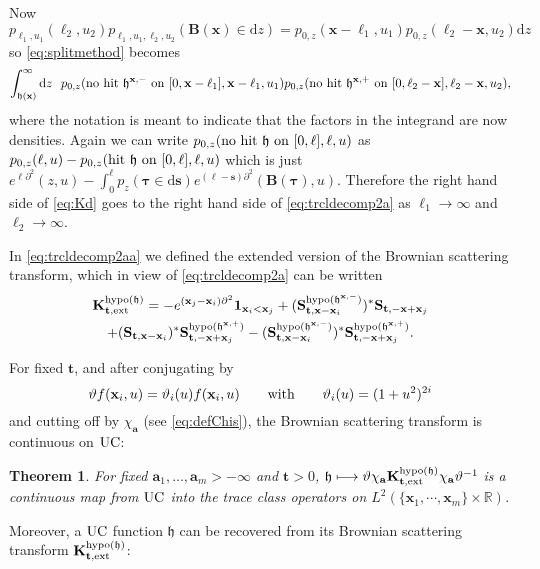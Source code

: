 \documentclass[letterpaper,reqno,11pt,oneside,final]{amsart}
\newtheorem{theorem}[thm]{Theorem}
\theoremstyle{definition}
\newcommand{\fh}{\mathfrak{h}}
\newcommand{\rr}{\mathbb{R}}
\newcommand{\p}{\partial}
\newcommand{\uno}[1]{\mathbf{1}_{#1}}
\newcommand{\uptext}[1]{\text{\upshape{#1}}}
\DeclareMathOperator{\hypo}{\uptext{hypo}}
\DeclareMathOperator{\UC}{\uptext{UC}}
\renewcommand{\d}{\mathrm{d}}
\newcommand{\fT}{\mathbf{S}}
\newcommand{\ft}{\mathbf{t}}
\newcommand{\fs}{\mathbf{s}}
\newcommand{\fx}{\mathbf{x}}
\newcommand{\fa}{\mathbf{a}}
\newcommand{\fB}{\mathbf{B}}
\newcommand{\fK}{\mathbf{K}}
\newcommand{\ftau}{\bm{\tau}}
\renewcommand{\P}{\chi}
\numberwithin{equation}{section}
\begin{document}
Now $ p_{\ell_1,u_1} (\ell_2, u_2) p_{\ell_1,u_1, \ell_2,u_2}(\fB(\fx)\in\d z) = 
p_{0,z}(\fx-\ell_1, u_1)p_{0,z}(\ell_2-\fx, u_2)\d z$ so \eqref{eq:splitmethod} becomes
\begin{equation}
\int_{\fh(\fx)}^\infty\d z~~ p_{0, z}( \uptext{no~hit~} \fh^{\fx,-}\uptext{~on~} [0,\fx-\ell_1],\fx-\ell_1, u_1) 
p_{0, z}( \uptext{no~hit~} \fh^{\fx,+}\uptext{~on~} [0,\ell_2-\fx],\ell_2-\fx, u_2),
\end{equation}
where the notation is meant to indicate that the factors in the integrand are now densities.
Again we can write $p_{0,z}( \uptext{no~hit~} \fh\uptext{~on~} [0,\ell],\ell,u)$ as $
p_{0, z}( \ell, u) -p_{0,z}( \uptext{hit~} \fh\uptext{~on~} [0,\ell],\ell,u) $ which is just
$e^{\ell\partial^2} (z,u) - \int_0^\ell p_z(\ftau \in\d\fs) e^{(\ell-\fs)\partial^2}(\fB(\ftau),u)$.
Therefore the right hand side of \eqref{eq:Kd} goes to the right hand side of 
\eqref{eq:trcldecomp2a} as $\ell_1\to \infty$ and $\ell_2\to \infty$.

In \eqref{eq:trcldecomp2aa} we defined the extended version of the Brownian scattering transform, which in view of \eqref{eq:trcldecomp2a} can be written
\begin{multline} \label{eq:trcldecomp2ab}
\fK^{\hypo(\fh)}_{\ft,\uptext{ext}}
= -e^{(\fx_j-\fx_i)\p^2}\uno{\fx_i<\fx_j}+
 ( \fT^{\hypo(\fh^{\fx,-})}_{\ft,\fx-\fx_i} )^*\fT_{\ft,-{\fx}+\fx_j}  \\
 + (\fT_{\ft,{\fx}-\fx_i} )^* \fT^{\hypo(\fh^{\fx,+})}_{\ft,-{\fx}+\fx_j}  - ( \fT^{\hypo(\fh^{\fx,-})}_{\ft,{\fx}-\fx_i} )^* \fT^{\hypo(\fh^{\fx,+})}_{\ft,-{\fx}+\fx_j}.
\end{multline}

For fixed $\ft$, and after conjugating by
\begin{equation}\label{eq:vartheta}
  \vartheta f(\fx_i,u)=\vartheta_i(u)f(\fx_i,u)\qquad\uptext{with}\qquad\vartheta_i(u)=(1+u^2)^{2i}
\end{equation}
and cutting off by $\P_\fa$ (see \eqref{eq:defChis}), the Brownian scattering transform is continuous on $\UC$:

\begin{theorem}\label{tm:bst1}
 For fixed $\fa_1,\ldots,\fa_m>-\infty$  and $\ft> 0$,
$
\fh\longmapsto\vartheta\chi_{\fa}\fK^{\hypo(\fh)}_{\ft,\uptext{ext}}\chi_{\fa}\vartheta^{-1}$
is a continuous map from $\UC$ into the trace class operators on $L^2(\{\fx_1,\cdots,\fx_m\} \times \rr)$.
\end{theorem}

Moreover, a $\UC$ function $\fh$ can be recovered from its Brownian scattering transform $\fK^{\hypo(\fh)}_{\ft,\uptext{ext}}$:
\end{document}
